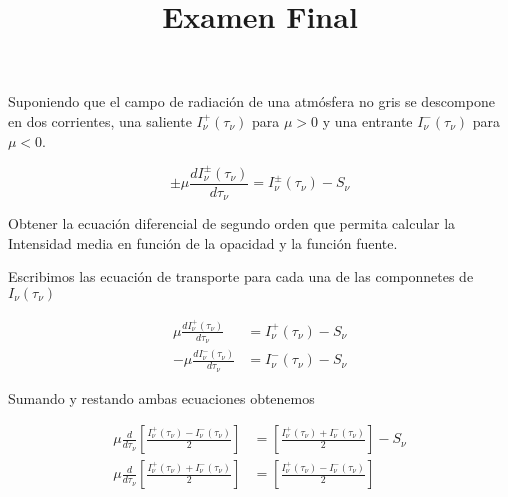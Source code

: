 \documentclass[10pt,spanish,a4paper]{practice}
\begin{document}
    \title{Examen Final}
    \maketitle

    \begin{problem}
        Suponiendo que el campo de radiación de una atmósfera no gris se descompone en dos corrientes, una saliente $I_{\nu}^{+}\left(\tau_{\nu}\right)$ para $\mu > 0$ y una entrante $I_{\nu}^{-}\left(\tau_{\nu}\right)$ para $\mu < 0$.

        $$
            \pm\mu\frac{d I_{\nu}^{\pm}\left(\tau_{\nu}\right)}{d \tau_{\nu}} = I_{\nu}^{\pm}\left(\tau_{\nu}\right) - S_{\nu}
        $$

        Obtener la ecuación diferencial de segundo orden que permita calcular la Intensidad media en función de la opacidad y la función fuente.

        \begin{solution}
            Escribimos las ecuación de transporte para cada una de las componnetes de $I_\nu(\tau_\nu)$

            \begin{align*}
                \mu \frac{d I_{\nu}^{+}\left(\tau_{\nu}\right)}{d\tau_{\nu}} &= I_{\nu}^{+}\left(\tau_{\nu}\right) - S_{\nu} \\
                - \mu \frac{d I_{\nu}^{-}\left(\tau_{\nu}\right)}{d \tau_{\nu}} &= I_{\nu}^{-}\left(\tau_{\nu}\right) - S_{\nu}
            \end{align*}

            Sumando y restando ambas ecuaciones obtenemos

            \begin{align*}
                \mu \frac{d}{d\tau_{\nu}}\left[\frac{I_{\nu}^{+}\left(\tau_{\nu}\right) - I_{\nu}^{-}\left(\tau_{\nu}\right)}{2}\right] &=  \left[\frac{I_{\nu}^{+}\left(\tau_{\nu}\right) + I_{\nu}^{-}\left(\tau_{\nu}\right)}{2}\right] - S_{\nu} \\
                \mu \frac{d}{d\tau_{\nu}}\left[\frac{I_{\nu}^{+}\left(\tau_{\nu}\right) + I_{\nu}^{-}\left(\tau_{\nu}\right)}{2}\right] &=  \left[\frac{I_{\nu}^{+}\left(\tau_{\nu}\right) - I_{\nu}^{-}\left(\tau_{\nu}\right)}{2}\right]
            \end{align*}


\end{solution}
\end{problem}
\end{document}
